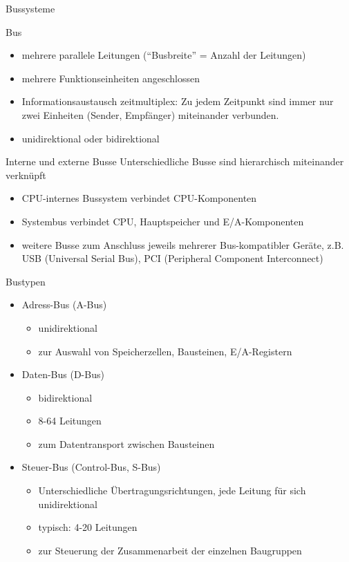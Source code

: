 \documentclass[utf8,9pt]{beamer}
\begin{document}
\begin{frame}{Bussysteme}{}
\begin{block}{Bus}
\begin{itemize}
\item mehrere parallele Leitungen ("`Busbreite"' = Anzahl der Leitungen)
\item mehrere Funktionseinheiten angeschlossen
\item Informationsaustausch zeitmultiplex: Zu jedem Zeitpunkt sind immer nur zwei Einheiten (Sender, Empfänger) miteinander verbunden.
\item unidirektional oder  bidirektional
\end{itemize}
\end{block}
\begin{block}{Interne und externe Busse}
Unterschiedliche Busse sind hierarchisch miteinander verknüpft
\begin{itemize}
\item CPU-internes Bussystem verbindet CPU-Komponenten
\item Systembus verbindet CPU, Hauptspeicher und E/A-Komponenten
\item weitere Busse zum Anschluss jeweils mehrerer Bus-kompatibler Geräte,
  z.B. USB (Universal Serial Bus), PCI (Peripheral Component Interconnect)
\end{itemize}
\end{block}
\end{frame}






\begin{frame}{}{}
\begin{block}{Bustypen}
\begin{itemize}
\item Adress-Bus (A-Bus)
   \begin{itemize}
   \item unidirektional
   \item zur Auswahl von Speicherzellen, Bausteinen, E/A-Registern
   \end{itemize}
\item Daten-Bus (D-Bus)
   \begin{itemize}
   \item bidirektional
   \item  8-64 Leitungen
   \item zum Datentransport zwischen Bausteinen
   \end{itemize}
\item Steuer-Bus (Control-Bus, S-Bus)
   \begin{itemize}
   \item Unterschiedliche Übertragungsrichtungen, jede Leitung für sich unidirektional
   \item typisch:  4-20 Leitungen
   \item zur Steuerung der Zusammenarbeit der einzelnen Baugruppen
   \end{itemize}
\end{itemize}
\end{block}
\end{frame}
\end{document}
